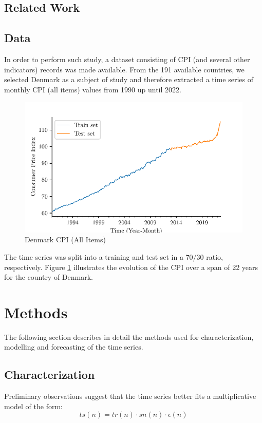 \documentclass[conference]{IEEEtran}
\begin{document}
\subsection{Related Work}
\subsection{Data}
In order to perform such study, a dataset consisting of CPI (and several other indicators) records was made available. From the 191 available countries, we selected Denmark as a subject of study and therefore extracted a time series of monthly CPI (all items) values from 1990 up until 2022.

\begin{figure}[hbtp]
    \centering
    \includegraphics[scale=0.68]{../figs/cpi.pdf}
    \caption{Denmark CPI (All Items)}
    \label{fig:cpi}
\end{figure}

The time series was split into a training and test set in a $70/30$ ratio, respectively. Figure \ref{fig:cpi} illustrates the evolution of the CPI over a span of 22 years for the country of Denmark.

\section{Methods}
The following section describes in detail the methods used for characterization, modelling and forecasting of the time series.
\subsection{Characterization}
Preliminary observations suggest that the time series better fits a multiplicative model of the form:
\[
ts(n)=tr(n)\cdot sn(n)\cdot \epsilon(n)
\]
\end{document}
